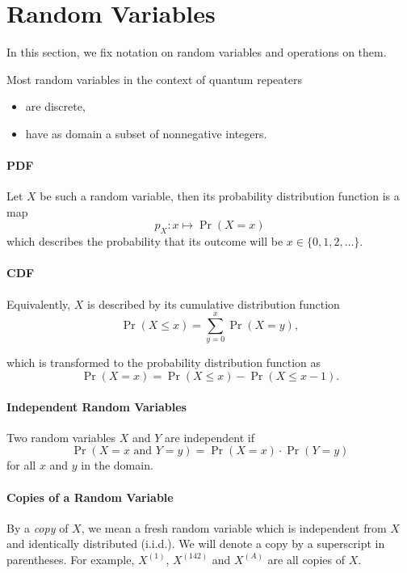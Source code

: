 \documentclass{masterthesis}
\begin{document}
\section*{Random Variables}

In this section, we fix notation on random variables and operations on them. 

Most random variables in the context of quantum repeaters
\begin{itemize}
    \item are discrete,
    \item have as domain a subset of nonnegative integers.
\end{itemize}

\paragraph*{PDF}\label{paragraph:pdf}
Let $X$ be such a random variable, then its probability distribution function is a map
\begin{equation}
    p_X : x \mapsto \Pr(X = x)
\end{equation} 
which describes the probability that its outcome will be $x \in \{0, 1, 2, \ldots \}$.

\paragraph*{CDF}\label{paragraph:cdf}
Equivalently, $X$ is described by its cumulative distribution function
\begin{equation}
    \Pr(X \leq x) = \sum_{y=0}^{x} \Pr(X = y),
\end{equation}

which is transformed to the probability distribution function as 
\begin{equation}
    \Pr(X = x) = \Pr(X \leq x) - \Pr(X \leq x - 1).
\end{equation}

\paragraph*{Independent Random Variables}\label{paragraph:independent_random_variables}
Two random variables $X$ and $Y$ are independent if 
\begin{equation}
    \Pr(X = x \text{ and } Y = y) = \Pr(X = x) \cdot \Pr(Y = y)
\end{equation}
for all $x$ and $y$ in the domain.

\paragraph{Copies of a Random Variable}\label{paragraph:copies_of_a_random_variable} By a \textit{copy} of $X$, we mean a fresh random variable which is independent from $X$ and identically distributed (i.i.d.).
We will denote a copy by a superscript in parentheses. For example, $X^{(1)}$, $X^{(142)}$ and $X^{(A)}$ are all copies of $X$.
\end{document}
